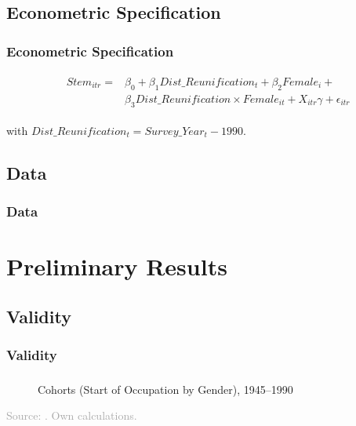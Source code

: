\documentclass[11pt, aspectratio=1610, xcolor={dvipsnames}]{beamer}
\begin{document}
	\subsection{Econometric Specification}
	\begin{frame}
		\frametitle{Econometric Specification}
		
			{\linespread{1}\normalsize
				\begin{align}
					&\begin{aligned}
						\label{eq:spec}
						Stem_{itr} =& \beta_{0} + \beta_{1} Dist\_Reunification_{t} + \beta_{2} Female_{i} +\\
						&\beta_{3} Dist\_Reunification \times Female_{it} + X_{itr} \gamma + \epsilon_{itr}
					\end{aligned}
				\end{align}
				
				\vspace{1cm}
				
				\hspace{6.2em} with $Dist\_Reunification_{t} = Survey\_Year_{t} - 1990$.
			}
		
	\end{frame}
	
	\subsection{Data}
	\begin{frame}
		\frametitle{Data}
	\end{frame}
	
	\section{Preliminary Results}
	\begin{frame}
		\frametitle{}
	\end{frame}
	
	\subsection{Validity}
	\begin{frame}
		\frametitle{Validity}
	\end{frame}
	
	\begin{frame}
		\frametitle{}
		
		\begin{figure}[h]
			\centering
			\caption{Cohorts (Start of Occupation by Gender), 1945--1990}
			\label{fig:validity}
			\resizebox{75mm}{!}{}
		\end{figure}
		
		{\scriptsize
		\textcolor{darkgray}{Source: \cite{Mayer1995}. Own calculations.}
		}
		
	\end{frame}
	
\end{document}
